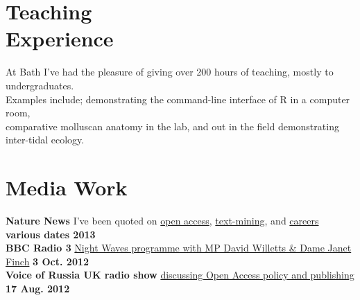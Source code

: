 \documentclass[margin,line]{resume}
\begin{document}
\begin{resume}
\vspace{-7 mm} 
    \section{\mysidestyle Teaching \\ Experience}

At Bath I've had the pleasure of giving over 200 hours of teaching, mostly to undergraduates. \\ Examples include; demonstrating the command-line interface of R in a computer room, \\ comparative molluscan anatomy in the lab, and out in the field demonstrating inter-tidal ecology.\\

\vspace{-7 mm} 
    \section{\mysidestyle Media Work}
\textbf{Nature News} I've been quoted on \href{http://dx.doi.org/10.1038/nature.2013.12384}{open access}, \href{http://dx.doi.org/10.1038/495295a}{text-mining}, and \href{http://dx.doi.org/10.1038/nj7442-539a}{careers} \hfill \textbf{various dates 2013}\\
\textbf{BBC Radio 3} \href{http://www.bbc.co.uk/iplayer/episode/b01n1rth/Night_Waves_Open_Accesss_Anne_Applebaum_Berenice/}{Night Waves programme with MP David Willetts \& Dame Janet Finch} \hfill \textbf{3 Oct. 2012}\\
\textbf{Voice of Russia UK radio show} \href{http://ruvr.co.uk/2012_08_17/85416708/}{discussing Open Access policy and publishing} \hfill \textbf{17 Aug. 2012}\\


\vspace{-7 mm} 
 




\end{resume}
\end{document}
